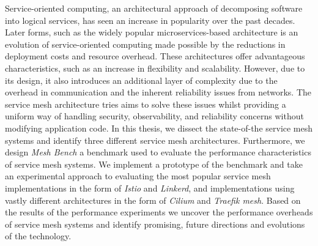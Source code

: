 


\begin{abstracts}        %
Service-oriented computing, an architectural approach of decomposing software into logical services, has seen an increase in popularity over the past decades. Later forms, such as the widely popular microservices-based architecture is an evolution of service-oriented computing made possible by the reductions in deployment costs and resource overhead. These architectures offer advantageous characteristics, such as an increase in flexibility and scalability. However, due to its design, it also introduces an additional layer of complexity due to the overhead in communication and the inherent reliability issues from networks. The service mesh architecture tries aims to solve these issues whilst providing a uniform way of handling security, observability, and reliability concerns without modifying application code. In this thesis, we dissect the state-of-the service mesh systems and identify three different service mesh architectures. Furthermore, we design \textit{Mesh Bench} a benchmark used to evaluate the performance characteristics of service mesh systems. We implement a prototype of the benchmark and take an experimental approach to evaluating the most popular service mesh implementations in the form of \textit{Istio} and \textit{Linkerd}, and implementations using vastly different architectures in the form of \textit{Cilium} and \textit{Traefik mesh}. Based on the results of the performance experiments we uncover the performance overheads of service mesh systems and identify promising, future directions and evolutions of the technology.

\end{abstracts}


